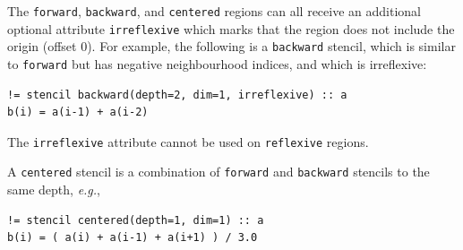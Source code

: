 \documentclass[9pt]{sigplanconf}
\theoremstyle{definition}
\newcommand{\eg}{\emph{e.g.}}
\newcommand{\term}[1]{\texttt{#1}}
\begin{document}
The \term{forward},
\term{backward}, and \term{centered} regions can all receive an
additional optional attribute \term{irreflexive} which marks
that the region does not include the origin (offset 0).
For example, the following is a \term{backward} stencil, which is similar
to \term{forward} but has negative neighbourhood indices, and which
is irreflexive:
%
\begin{verbatim}
!= stencil backward(depth=2, dim=1, irreflexive) :: a
b(i) = a(i-1) + a(i-2)
\end{verbatim}
%
The \term{irreflexive} attribute cannot be used on \term{reflexive}
regions.

A \texttt{centered} stencil is a combination of \texttt{forward}
and \texttt{backward} stencils to the same depth, \eg{},
\begin{verbatim}
!= stencil centered(depth=1, dim=1) :: a
b(i) = ( a(i) + a(i-1) + a(i+1) ) / 3.0
\end{verbatim}
\end{document}
